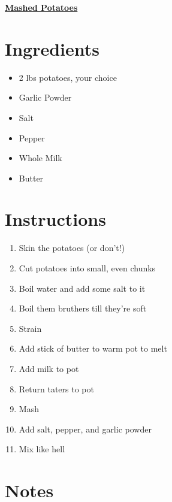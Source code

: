 \documentclass[11pt]{article}
\begin{document}
	\begin{center}\begin{huge}\underline{\textbf{Mashed Potatoes}}\end{huge}\end{center}

	\section*{Ingredients}
	\begin{itemize}
		\item 2 lbs potatoes, your choice
		\item Garlic Powder
		\item Salt
		\item Pepper
		\item Whole Milk
		\item Butter
	\end{itemize}
	
	\section*{Instructions}
	\begin{enumerate}
		\item Skin the potatoes (or don't!)
		\item Cut potatoes into small, even chunks
		\item Boil water and add some salt to it
		\item Boil them bruthers till they're soft
		\item Strain
		\item Add stick of butter to warm pot to melt
		\item Add milk to pot
		\item Return taters to pot
		\item Mash
		\item Add salt, pepper, and garlic powder
		\item Mix like hell
	\end{enumerate}
	
	\section*{Notes}
	
\end{document}

